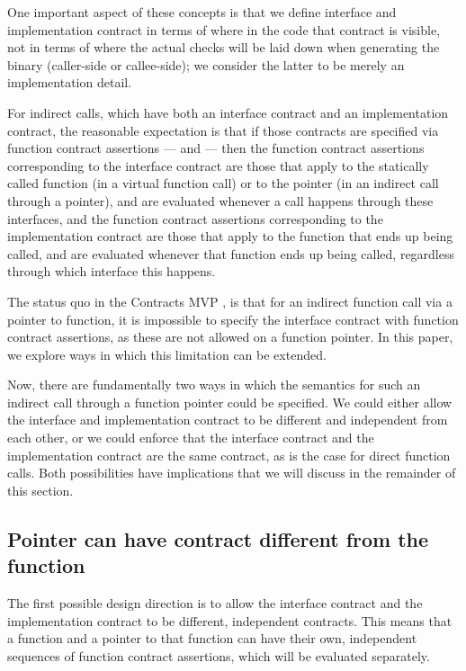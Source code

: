 One important aspect of these concepts is that we define interface and implementation contract in terms of where in the code that contract is visible, not in terms of where the actual checks will be laid down when generating the binary (caller-side or callee-side); we consider the latter to be merely an implementation detail.

For indirect calls, which have both an interface contract and an implementation contract, the reasonable expectation is that if those contracts are specified via function contract assertions ---  and  --- then the function contract assertions corresponding to the interface contract are those that apply to the statically called function (in a virtual function call) or to the pointer (in an indirect call through a pointer), and are evaluated whenever a call happens through these interfaces, and the function contract assertions corresponding to the implementation contract are those that apply to the function that ends up being called, and are evaluated whenever that function ends up being called, regardless through which interface this happens.

The status quo in the Contracts MVP \cite{P2900R7}, is that for an indirect function call via a pointer to function, it is impossible to specify the interface contract with function contract assertions, as these are not allowed on a function pointer. In this paper, we explore ways in which this limitation can be extended.

Now, there are fundamentally two ways in which the semantics for such an indirect call through a function pointer could be specified. We could either allow the interface and implementation contract to be different and independent from each other, or we could enforce that the interface contract and the implementation contract are the same contract, as is the case for direct function calls. Both possibilities have implications that we will discuss in the remainder of this section.


\subsection{Pointer can have contract different from the function}
\label{subsec:diffcontract}

The first possible design direction is to allow the interface contract and the implementation contract to be different, independent contracts. This means that a function and a pointer to that function can have their own, independent sequences of function contract assertions, which will be evaluated separately. 

